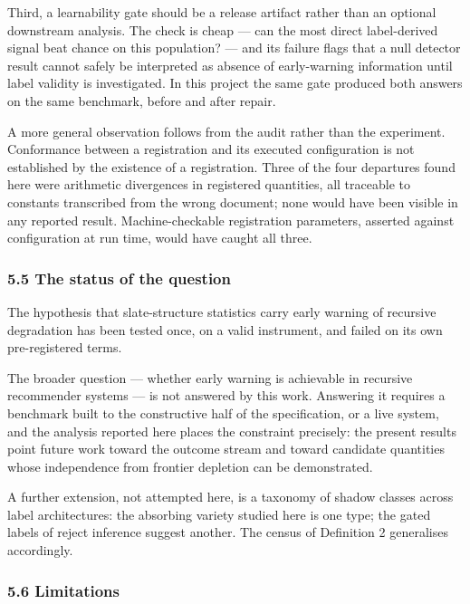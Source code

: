 \documentclass[
  11pt,
]{article}
\newcounter{none} %
\begin{document}
Third, a learnability gate should be a release artifact rather than an
optional downstream analysis. The check is cheap --- can the most direct
label-derived signal beat chance on this population? --- and its failure
flags that a null detector result cannot safely be interpreted as
absence of early-warning information until label validity is
investigated. In this project the same gate produced both answers on the
same benchmark, before and after repair.

A more general observation follows from the audit rather than the
experiment. Conformance between a registration and its executed
configuration is not established by the existence of a registration.
Three of the four departures found here were arithmetic divergences in
registered quantities, all traceable to constants transcribed from the
wrong document; none would have been visible in any reported result.
Machine-checkable registration parameters, asserted against
configuration at run time, would have caught all three.

\subsubsection{5.5 The status of the
question}\label{the-status-of-the-question}

The hypothesis that slate-structure statistics carry early warning of
recursive degradation has been tested once, on a valid instrument, and
failed on its own pre-registered terms.

The broader question --- whether early warning is achievable in
recursive recommender systems --- is not answered by this work.
Answering it requires a benchmark built to the constructive half of the
specification, or a live system, and the analysis reported here places
the constraint precisely: the present results point future work toward
the outcome stream and toward candidate quantities whose independence
from frontier depletion can be demonstrated.

A further extension, not attempted here, is a taxonomy of shadow classes
across label architectures: the absorbing variety studied here is one
type; the gated labels of reject inference suggest another. The census
of Definition 2 generalises accordingly.

\subsubsection{5.6 Limitations}\label{limitations}
\end{document}

